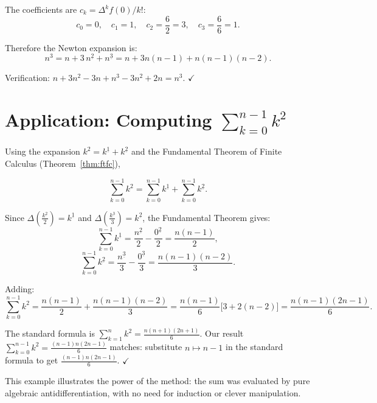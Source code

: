 The coefficients are \(c_k = \Delta^k f(0)/k!\):
\[
c_0 = 0,\quad c_1 = 1,\quad c_2 = \frac{6}{2} = 3,\quad c_3 = \frac{6}{6} = 1.
\]

Therefore the Newton expansion is:
\[
n^3
= n + 3\,n^{\underline{2}} + n^{\underline{3}}
= n + 3n(n-1) + n(n-1)(n-2).
\]

Verification: \(n + 3n^2 - 3n + n^3 - 3n^2 + 2n = n^3.\) \(\checkmark\)

\section*{\texorpdfstring{Application: Computing \(\sum_{k=0}^{n-1} k^2\)}{Application: Computing sum k=0 to n-1 k squared}}

Using the expansion \(k^2 = k^{\underline{1}} + k^{\underline{2}}\) and the
Fundamental Theorem of Finite Calculus (Theorem~\ref{thm:ftfc}),

\[
\sum_{k=0}^{n-1} k^2
= \sum_{k=0}^{n-1} k^{\underline{1}} + \sum_{k=0}^{n-1} k^{\underline{2}}.
\]

Since \(\Delta\!\left(\tfrac{k^{\underline{2}}}{2}\right) = k^{\underline{1}}\) and
\(\Delta\!\left(\tfrac{k^{\underline{3}}}{3}\right) = k^{\underline{2}}\),
the Fundamental Theorem gives:
\[
\sum_{k=0}^{n-1} k^{\underline{1}}
= \frac{n^{\underline{2}}}{2} - \frac{0^{\underline{2}}}{2}
= \frac{n(n-1)}{2},
\]
\[
\sum_{k=0}^{n-1} k^{\underline{2}}
= \frac{n^{\underline{3}}}{3} - \frac{0^{\underline{3}}}{3}
= \frac{n(n-1)(n-2)}{3}.
\]

Adding:
\[
\sum_{k=0}^{n-1} k^2
= \frac{n(n-1)}{2} + \frac{n(n-1)(n-2)}{3}
= \frac{n(n-1)}{6}\bigl[3 + 2(n-2)\bigr]
= \frac{n(n-1)(2n-1)}{6}.
\]

\begin{remark*}
The standard formula is \(\displaystyle\sum_{k=1}^{n} k^2 = \tfrac{n(n+1)(2n+1)}{6}\).
Our result \(\displaystyle\sum_{k=0}^{n-1} k^2 = \tfrac{(n-1)n(2n-1)}{6}\) matches:
substitute \(n \mapsto n-1\) in the standard formula to get
\(\tfrac{(n-1)n(2n-1)}{6}\). \(\checkmark\)

This example illustrates the power of the method: the sum was evaluated
by pure algebraic antidifferentiation, with no need for induction or
clever manipulation.
\end{remark*}
